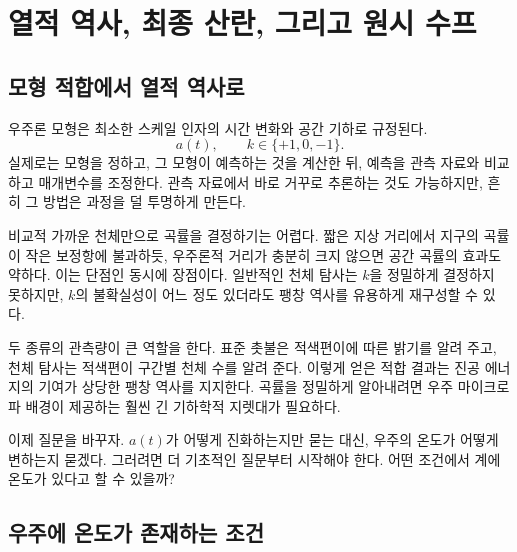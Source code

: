 \chapter{열적 역사, 최종 산란, 그리고 원시 수프}


\section{모형 적합에서 열적 역사로}

우주론 모형은 최소한 스케일 인자의 시간 변화와 공간 기하로 규정된다.
\begin{equation}
a(t),
\qquad
k\in\{+1,0,-1\}.
\end{equation}
실제로는 모형을 정하고, 그 모형이 예측하는 것을 계산한 뒤, 예측을 관측 자료와 비교하고 매개변수를 조정한다. 관측 자료에서 바로 거꾸로 추론하는 것도 가능하지만, 흔히 그 방법은 과정을 덜 투명하게 만든다.

비교적 가까운 천체만으로 곡률을 결정하기는 어렵다. 짧은 지상 거리에서 지구의 곡률이 작은 보정항에 불과하듯, 우주론적 거리가 충분히 크지 않으면 공간 곡률의 효과도 약하다. 이는 단점인 동시에 장점이다. 일반적인 천체 탐사는 \(k\)을 정밀하게 결정하지 못하지만, \(k\)의 불확실성이 어느 정도 있더라도 팽창 역사를 유용하게 재구성할 수 있다.

두 종류의 관측량이 큰 역할을 한다. 표준 촛불은 적색편이에 따른 밝기를 알려 주고, 천체 탐사는 적색편이 구간별 천체 수를 알려 준다. 이렇게 얻은 적합 결과는 진공 에너지의 기여가 상당한 팽창 역사를 지지한다. 곡률을 정밀하게 알아내려면 우주 마이크로파 배경이 제공하는 훨씬 긴 기하학적 지렛대가 필요하다.

이제 질문을 바꾸자. \(a(t)\)가 어떻게 진화하는지만 묻는 대신, 우주의 온도가 어떻게 변하는지 묻겠다. 그러려면 더 기초적인 질문부터 시작해야 한다. 어떤 조건에서 계에 온도가 있다고 할 수 있을까?

\section{우주에 온도가 존재하는 조건}

